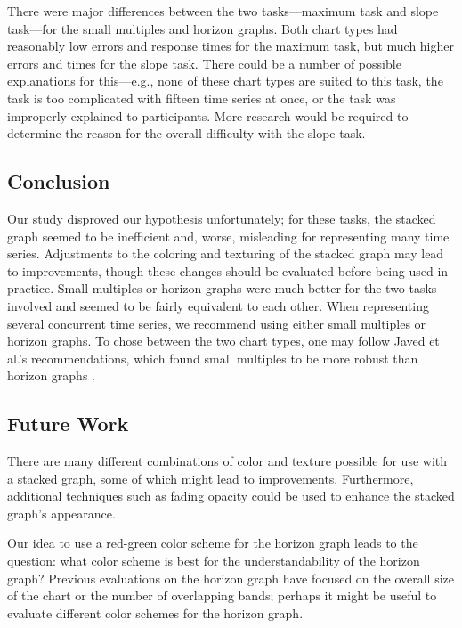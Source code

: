\documentclass{article}
\begin{document}
There were major differences between the two tasks---maximum task and slope task---for the small multiples and horizon graphs.  Both chart types had reasonably low errors and response times for the maximum task, but much higher errors and times for the slope task.  There could be a number of possible explanations for this---e.g., none of these chart types are suited to this task, the task is too complicated with fifteen time series at once, or the task was improperly explained to participants.  More research would be required to determine the reason for the overall difficulty with the slope task.

\subsection{Conclusion}

Our study disproved our hypothesis unfortunately; for these tasks, the stacked graph seemed to be inefficient and, worse, misleading for representing many time series.  Adjustments to the coloring and texturing of the stacked graph may lead to improvements, though these changes should be evaluated before being used in practice.  Small multiples or horizon graphs were much better for the two tasks involved and seemed to be fairly equivalent to each other.  When representing several concurrent time series, we recommend using either small multiples or horizon graphs.  To chose between the two chart types, one may follow Javed et al.'s recommendations, which found small multiples to be more robust than horizon graphs \cite{javed2010}.  
\subsection{Future Work}

There are many different combinations of color and texture possible for use with a stacked graph, some of which might lead to improvements.  Furthermore, additional techniques such as fading opacity could be used to enhance the stacked graph's appearance.

Our idea to use a red-green color scheme for the horizon graph leads to the question: what color scheme is best for the understandability of the horizon graph?  Previous evaluations on the horizon graph have focused on the overall size of the chart or the number of overlapping bands; perhaps it might be useful to evaluate different color schemes for the horizon graph.




\end{document}
